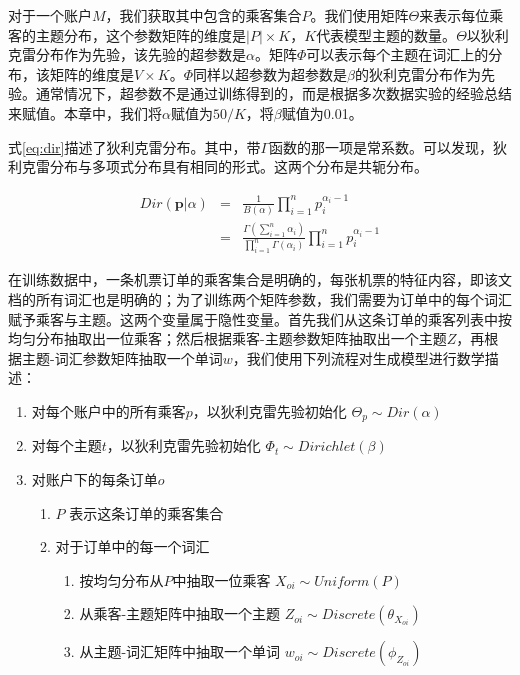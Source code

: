 对于一个账户$M$，我们获取其中包含的乘客集合$P$。我们使用矩阵$\Theta$来表示每位乘客的主题分布，这个参数矩阵的维度是$|P| \times K$，$K$代表模型主题的数量。$\Theta$以狄利克雷分布作为先验，该先验的超参数是$\alpha$。矩阵$\Phi$可以表示每个主题在词汇上的分布，该矩阵的维度是$V \times K$。$\Phi$同样以超参数为超参数是$\beta$的狄利克雷分布作为先验。通常情况下，超参数不是通过训练得到的，而是根据多次数据实验的经验总结来赋值。本章中，我们将$\alpha$赋值为$50/K$，将$\beta$赋值为0.01。

式\ref{eq:dir}描述了狄利克雷分布。其中，带$\Gamma$函数的那一项是常系数。可以发现，狄利克雷分布与多项式分布具有相同的形式。这两个分布是共轭分布。

\begin{eqnarray}
\label{eq:dir}
	Dir(\mathbf{p}|\alpha) & = & \frac{1}{B(\alpha)}\prod_{i=1}^n p_i^{\alpha_i-1} \nonumber \\
	& = & \frac{\Gamma(\sum_{i=1}^n \alpha_i)}{\prod_{i=1}^n \Gamma(\alpha_i)}\prod_{i=1}^n p_i^{\alpha_i-1}
\end{eqnarray}

在训练数据中，一条机票订单的乘客集合是明确的，每张机票的特征内容，即该文档的所有词汇也是明确的；为了训练两个矩阵参数，我们需要为订单中的每个词汇赋予乘客与主题。这两个变量属于隐性变量。首先我们从这条订单的乘客列表中按均匀分布抽取出一位乘客；然后根据乘客-主题参数矩阵抽取出一个主题$Z$，再根据主题-词汇参数矩阵抽取一个单词$w$，我们使用下列流程对生成模型进行数学描述：

\begin{enumerate}
\item 对每个账户中的所有乘客$p$，以狄利克雷先验初始化 $\Theta_p \sim Dir(\alpha)$
\item 对每个主题$t$，以狄利克雷先验初始化 $\Phi_t \sim Dirichlet(\beta)$
\item 对账户下的每条订单$o$
       \begin{enumerate}[fullwidth,itemindent=1em,label=(\alph*)]
       \item $P$ 表示这条订单的乘客集合
       \item 对于订单中的每一个词汇
              \begin{enumerate}[fullwidth,itemindent=2em,label=(\roman*)]
              \item 按均匀分布从$P$中抽取一位乘客 $X_{oi} \sim Uniform(P)$
              \item 从乘客-主题矩阵中抽取一个主题 $Z_{oi} \sim Discrete(\theta_{X_{oi}})$
              \item 从主题-词汇矩阵中抽取一个单词 $w_{oi} \sim Discrete(\phi_{Z_{oi}})$
              \end{enumerate}
       \end{enumerate}
\end{enumerate}

